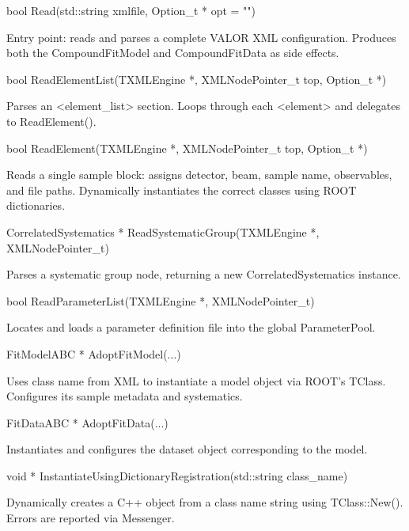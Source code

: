 \begin{description}[align=left, labelsep=0.6em]

  \item[] {\color{cadmiumred} bool Read(std::string xmlfile, Option\_t * opt = "")}

  Entry point: reads and parses a complete VALOR XML configuration.  
  Produces both the {\color{cadmiumgreen} CompoundFitModel} and {\color{cadmiumgreen} CompoundFitData} as side effects.

  \item[] {\color{cadmiumred} bool ReadElementList(TXMLEngine *, XMLNodePointer\_t top, Option\_t *)}

  Parses an {\color{amber}<element\_list>} section. Loops through each {\color{amber}<element>} and delegates to {\color{cadmiumred} ReadElement()}.

  \item[] {\color{cadmiumred} bool ReadElement(TXMLEngine *, XMLNodePointer\_t top, Option\_t *)}

  Reads a single sample block: assigns detector, beam, sample name, observables, and file paths.  
  Dynamically instantiates the correct classes using ROOT dictionaries.

  \item[] {\color{cadmiumred} CorrelatedSystematics * ReadSystematicGroup(TXMLEngine *, XMLNodePointer\_t)}

  Parses a systematic group node, returning a new {\color{cadmiumgreen} CorrelatedSystematics} instance.

  \item[] {\color{cadmiumred} bool ReadParameterList(TXMLEngine *, XMLNodePointer\_t)}

  Locates and loads a parameter definition file into the global {\color{cadmiumgreen} ParameterPool}.

  \item[] {\color{cadmiumred} FitModelABC * AdoptFitModel(...)}

  Uses class name from XML to instantiate a model object via ROOT's {\color{cadmiumgreen} TClass}.  
  Configures its sample metadata and systematics.

  \item[] {\color{cadmiumred} FitDataABC * AdoptFitData(...)}

  Instantiates and configures the dataset object corresponding to the model.

  \item[] {\color{cadmiumred} void * InstantiateUsingDictionaryRegistration(std::string class\_name)}

  Dynamically creates a C++ object from a class name string using {\color{cadmiumgreen} TClass::New()}.  
  Errors are reported via {\color{cadmiumgreen} Messenger}.

\end{description}

